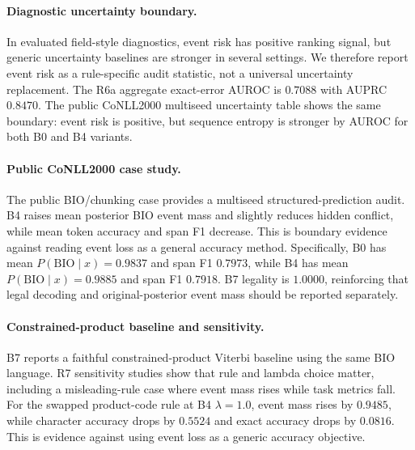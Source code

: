 \paragraph{Diagnostic uncertainty boundary.}
In evaluated field-style diagnostics, event risk has positive ranking signal,
but generic uncertainty baselines are stronger in several settings.  We
therefore report event risk as a rule-specific audit statistic, not a universal
uncertainty replacement.  The R6a aggregate exact-error AUROC is \(0.7088\)
with AUPRC \(0.8470\).  The public CoNLL2000 multiseed uncertainty table shows
the same boundary: event risk is positive, but sequence entropy is stronger by
AUROC for both B0 and B4 variants.




\paragraph{Public CoNLL2000 case study.}
The public BIO/chunking case provides a multiseed structured-prediction audit.
B4 raises mean posterior BIO event mass and slightly reduces hidden conflict,
while mean token accuracy and span F1 decrease.  This is boundary evidence
against reading event loss as a general accuracy method.  Specifically, B0 has
mean \(P(\mathrm{BIO}\mid x)=0.9837\) and span F1 \(0.7973\), while B4 has mean
\(P(\mathrm{BIO}\mid x)=0.9885\) and span F1 \(0.7918\).  B7 legality is
\(1.0000\), reinforcing that legal decoding and original-posterior event mass
should be reported separately.



\paragraph{Constrained-product baseline and sensitivity.}
B7 reports a faithful constrained-product Viterbi baseline using the same BIO
language.  R7 sensitivity studies show that rule and lambda choice matter,
including a misleading-rule case where event mass rises while task metrics
fall.  For the swapped product-code rule at B4 \(\lambda=1.0\), event mass rises
by \(0.9485\), while character accuracy drops by \(0.5524\) and exact accuracy
drops by \(0.0816\).  This is evidence against using event loss as a generic
accuracy objective.



